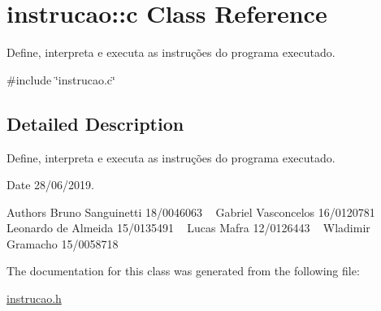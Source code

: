 \hypertarget{classinstrucao_1_1c}{}\section{instrucao\+::c Class Reference}
\label{classinstrucao_1_1c}


Define, interpreta e executa as instruções do programa executado.  




{\ttfamily \#include \char`\"{}instrucao.\+c\char`\"{}}



\subsection{Detailed Description}
Define, interpreta e executa as instruções do programa executado. 

\begin{DoxyDate}{Date}
28/06/2019.
\end{DoxyDate}
\begin{DoxyAuthor}{Authors}
Bruno Sanguinetti 18/0046063 ~\newline
Gabriel Vasconcelos 16/0120781 ~\newline
Leonardo de Almeida 15/0135491 ~\newline
Lucas Mafra 12/0126443 ~\newline
Wladimir Gramacho 15/0058718 ~\newline

\end{DoxyAuthor}


The documentation for this class was generated from the following file\+:\begin{DoxyCompactItemize}
\item 
\mbox{\hyperlink{instrucao_8h}{instrucao.\+h}}\end{DoxyCompactItemize}
